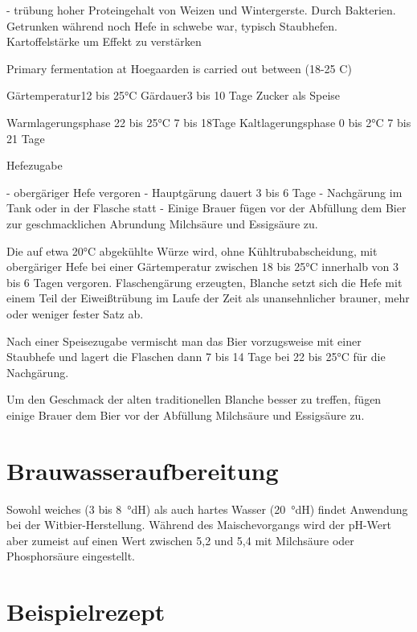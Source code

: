 \documentclass[a4paper,parskip=half]{scrartcl}
\begin{document}
\parencite[39]{Hieronymus2010}
- trübung hoher Proteingehalt von Weizen und Wintergerste.
 Durch Bakterien. Getrunken während noch Hefe in schwebe war,
 typisch Staubhefen. Kartoffelstärke um Effekt zu verstärken

\parencite[31]{Sparrow2002}
Primary fermentation at Hoegaarden is carried out between (18-25 C)

\parencite[13]{Strottner1999}
Gärtemperatur12 bis 25°C
Gärdauer3 bis 10 Tage
Zucker als Speise

\parencite[14]{Strottner1999}
Warmlagerungsphase
22 bis 25°C
7 bis 18Tage
Kaltlagerungsphase
0 bis 2°C
7 bis 21 Tage

Hefezugabe


\parencite[2]{Strottner1999}
- obergäriger Hefe vergoren
- Hauptgärung dauert 3 bis 6 Tage
- Nachgärung im Tank oder in der Flasche statt
- Einige Brauer fügen vor der Abfüllung dem Bier zur geschmacklichen Abrundung Milchsäure und Essigsäure zu.

\parencite[18]{Strottner1999}
Die auf etwa 20°C abgekühlte Würze wird, ohne Kühltrubabscheidung, mit
obergäriger Hefe bei einer Gärtemperatur zwischen 18 bis 25°C innerhalb von
3 bis 6 Tagen vergoren. 
Flaschengärung erzeugten, Blanche setzt sich die Hefe mit einem
Teil der Eiweißtrübung im Laufe der Zeit als unansehnlicher brauner, mehr oder
weniger fester Satz ab.

Nach einer Speisezugabe vermischt man das Bier vorzugsweise
mit einer Staubhefe und lagert die Flaschen dann 7 bis 14 Tage bei 22 bis 25°C für
die Nachgärung.

Um den Geschmack der alten traditionellen Blanche besser zu treffen, fügen einige
Brauer dem Bier vor der Abfüllung Milchsäure und Essigsäure zu.





\section*{Brauwasseraufbereitung}

Sowohl weiches (3 bis 8~°dH) als auch hartes Wasser (20~°dH) findet
Anwendung bei der Witbier-Herstellung. Während des Maischevorgangs
wird der pH-Wert aber zumeist auf einen Wert zwischen 5,2 und
5,4 mit Milchsäure oder Phosphorsäure eingestellt. \parencite[14]{Strottner1999}

\section*{Beispielrezept}
\end{document}
